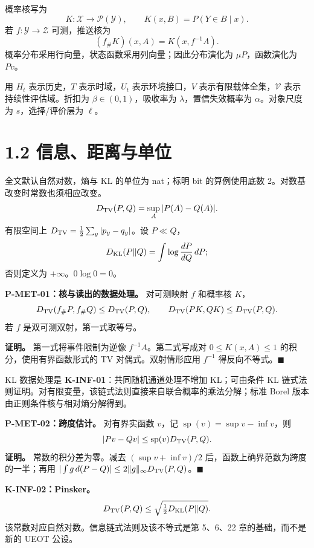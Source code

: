\documentclass[
  11pt,
  oneside]{book}
\begin{document}
概率核写为 \[K:\mathcal X\longrightarrow\mathcal P(\mathcal Y),\qquad
K(x,B)=P(Y\in B\mid x).\] 若 \(f:\mathcal Y\to\mathcal Z\) 可测，推送核为 \[(f_\#K)(x,A)=K(x,f^{-1}A).\] 概率分布采用行向量，状态函数采用列向量；因此分布演化为 \(\mu P\)，函数演化为 \(Pv\)。

用 \(H_t\) 表示历史，\(T\) 表示时域，\(U_t\) 表示环境接口，\(V\) 表示有限载体全集，\(\mathcal V\) 表示持续性评估域。折扣为 \(\beta\in(0,1)\)，吸收率为 \(\lambda\)，置信失效概率为 \(\alpha\)。对象尺度为 \(s\)，选择/评价层为 \(\ell\)。

\section{1.2 信息、距离与单位}\label{ux4fe1ux606fux8dddux79bbux4e0eux5355ux4f4d}

全文默认自然对数，熵与 KL 的单位为 nat；标明 bit 的算例使用底数 2。对数基改变时常数也须相应改变。 \[D_{\rm TV}(P,Q)=\sup_A|P(A)-Q(A)|.\] 有限空间上 \(D_{\rm TV}=\frac12\sum_y|p_y-q_y|\)。设 \(P\ll Q\)， \[D_{\rm KL}(P\|Q)=\int\log\frac{dP}{dQ}\,dP;\] 否则定义为 \(+\infty\)。\(0\log0=0\)。

\hypertarget{p-met-01}{}\label{p-met-01}

\textbf{P-MET-01：核与读出的数据处理。} 对可测映射 \(f\) 和概率核 \(K\)， \[D_{\rm TV}(f_\#P,f_\#Q)\le D_{\rm TV}(P,Q),\qquad
D_{\rm TV}(PK,QK)\le D_{\rm TV}(P,Q).\] 若 \(f\) 是双可测双射，第一式取等号。

\textbf{证明。} 第一式将事件限制为逆像 \(f^{-1}A\)。第二式写成对 \(0\le K(x,A)\le1\) 的积分，使用有界函数形式的 TV 对偶式。双射情形应用 \(f^{-1}\) 得反向不等式。\(\blacksquare\)

KL 数据处理是 \textbf{K-INF-01}：共同随机通道处理不增加 KL；可由条件 KL 链式法则证明。对有限变量，该链式法则直接来自联合概率的乘法分解；标准 Borel 版本由正则条件核与相对熵分解得到。

\hypertarget{p-met-02}{}\label{p-met-02}

\textbf{P-MET-02：跨度估计。} 对有界实函数 \(v\)，记 \(\operatorname{sp}(v)=\sup v-\inf v\)，则 \[|Pv-Qv|\le\operatorname{sp}(v)D_{\rm TV}(P,Q).\] \textbf{证明。} 常数的积分差为零。减去 \((\sup v+\inf v)/2\) 后，函数上确界范数为跨度的一半；再用 \(|\int g\,d(P-Q)|\le2\|g\|_\infty D_{\rm TV}(P,Q)\)。\(\blacksquare\)

\textbf{K-INF-02：Pinsker。} \[D_{\rm TV}(P,Q)\le\sqrt{\tfrac12D_{\rm KL}(P\|Q)}.\] 该常数对应自然对数。信息链式法则及该不等式是第 5、6、22 章的基础，而不是新的 UEOT 公设。
\end{document}
